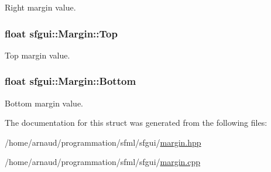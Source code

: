 Right margin value. 

\hypertarget{structsfgui_1_1Margin_1ab360b58e3be2e8385f8e4225508ea4}{
\subsubsection[Top]{\setlength{\rightskip}{0pt plus 5cm}float {\bf sfgui::Margin::Top}}}
\label{structsfgui_1_1Margin_1ab360b58e3be2e8385f8e4225508ea4}


Top margin value. 

\hypertarget{structsfgui_1_1Margin_f9b744e36bb7d913b20959f7c9516fa6}{
\subsubsection[Bottom]{\setlength{\rightskip}{0pt plus 5cm}float {\bf sfgui::Margin::Bottom}}}
\label{structsfgui_1_1Margin_f9b744e36bb7d913b20959f7c9516fa6}


Bottom margin value. 



The documentation for this struct was generated from the following files:\begin{CompactItemize}
\item 
/home/arnaud/programmation/sfml/sfgui/\hyperlink{margin_8hpp}{margin.hpp}\item 
/home/arnaud/programmation/sfml/sfgui/\hyperlink{margin_8cpp}{margin.cpp}\end{CompactItemize}
